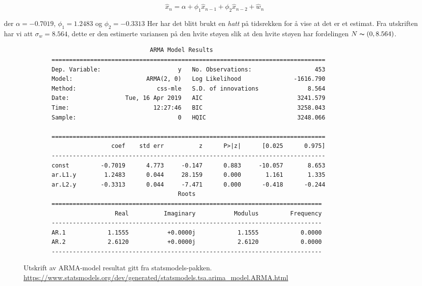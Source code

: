 \begin{equation}
\hat{x}_{n} = \alpha + \phi_{1}\hat{x}_{n-1} + \phi_{2}\hat{x}_{n-2} + \hat{w}_{n}
\end{equation}

der $\alpha = -0.7019$, $\phi_{1} = 1.2483$ og $\phi_{2} = -0.3313$
Her har det blitt brukt en \emph{hatt} på tidsrekken for å vise at det er et estimat. Fra utskriften har vi att $\sigma_{w} = 8.564$, dette er den estimerte variansen på den hvite støyen slik at den hvite støyen har fordelingen $N \thicksim (0, 8.564)$.

\begin{figure}[hbt!]
    \begin{lstlisting}
                                    ARMA Model Results
        ==============================================================================
        Dep. Variable:                      y   No. Observations:                  453
        Model:                     ARMA(2, 0)   Log Likelihood               -1616.790
        Method:                       css-mle   S.D. of innovations              8.564
        Date:                Tue, 16 Apr 2019   AIC                           3241.579
        Time:                        12:27:46   BIC                           3258.043
        Sample:                             0   HQIC                          3248.066
        
        ==============================================================================
                         coef    std err          z      P>|z|      [0.025      0.975]
        ------------------------------------------------------------------------------
        const         -0.7019      4.773     -0.147      0.883     -10.057       8.653
        ar.L1.y        1.2483      0.044     28.159      0.000       1.161       1.335
        ar.L2.y       -0.3313      0.044     -7.471      0.000      -0.418      -0.244
                                            Roots
        =============================================================================
                          Real          Imaginary           Modulus         Frequency
        -----------------------------------------------------------------------------
        AR.1            1.1555           +0.0000j            1.1555            0.0000
        AR.2            2.6120           +0.0000j            2.6120            0.0000
        -----------------------------------------------------------------------------
    \end{lstlisting}
\caption{Utskrift av ARMA-model resultat gitt fra statsmodels-pakken. \url{https://www.statsmodels.org/dev/generated/statsmodels.tsa.arima\_model.ARMA.html}}
\label{Armacoefs}
\end{figure}



